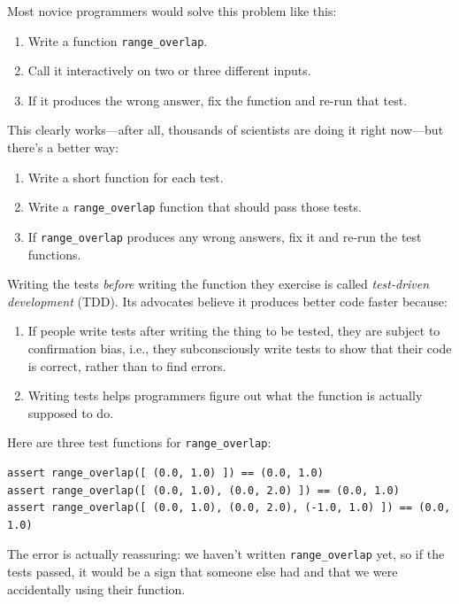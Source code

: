 \documentclass[]{book}
\newcommand{\gdef}[2]{\emph{#2}}
\begin{document}
Most novice programmers would solve this problem like this:

\begin{enumerate}
\item
  Write a function \texttt{range\_overlap}.
\item
  Call it interactively on two or three different inputs.
\item
  If it produces the wrong answer, fix the function and re-run that
  test.
\end{enumerate}

This clearly works---after all, thousands of scientists are doing it
right now---but there's a better way:

\begin{enumerate}
\item
  Write a short function for each test.
\item
  Write a \texttt{range\_overlap} function that should pass those tests.
\item
  If \texttt{range\_overlap} produces any wrong answers, fix it and
  re-run the test functions.
\end{enumerate}

Writing the tests \emph{before} writing the function they exercise is
called \gdef{g:test-driven-development}{test-driven development}
(TDD). Its advocates believe it produces better code faster because:

\begin{enumerate}
\item
  If people write tests after writing the thing to be tested, they are
  subject to confirmation bias, i.e., they subconsciously write tests to
  show that their code is correct, rather than to find errors.
\item
  Writing tests helps programmers figure out what the function is
  actually supposed to do.
\end{enumerate}

Here are three test functions for \texttt{range\_overlap}:

\begin{verbatim}
assert range_overlap([ (0.0, 1.0) ]) == (0.0, 1.0)
assert range_overlap([ (0.0, 1.0), (0.0, 2.0) ]) == (0.0, 1.0)
assert range_overlap([ (0.0, 1.0), (0.0, 2.0), (-1.0, 1.0) ]) == (0.0, 1.0)
\end{verbatim}

The error is actually reassuring: we haven't written
\texttt{range\_overlap} yet, so if the tests passed, it would be a sign
that someone else had and that we were accidentally using their
function.
\end{document}
